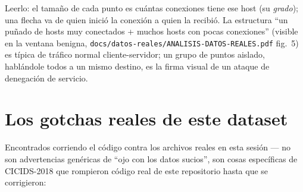 \documentclass[11pt]{article}
\newcommand{\code}[1]{\texttt{\small #1}}
\begin{document}
Leerlo: el tamaño de cada punto es cuántas conexiones tiene ese host (su \emph{grado});
una flecha va de quien inició la conexión a quien la recibió. La estructura ``un
puñado de hosts muy conectados + muchos hosts con pocas conexiones'' (visible en la
ventana benigna, \code{docs/datos-reales/ANALISIS-DATOS-REALES.pdf} fig.\ 5) es típica de
tráfico normal cliente-servidor; un grupo de puntos aislado, hablándole todos a un mismo
destino, es la firma visual de un ataque de denegación de servicio.

\section{Los gotchas reales de este dataset}
\label{sec:gotchas}

Encontrados corriendo el código contra los archivos reales en esta sesión --- no son
advertencias genéricas de ``ojo con los datos sucios'', son cosas específicas de
CICIDS-2018 que rompieron código real de este repositorio hasta que se corrigieron:
\end{document}
